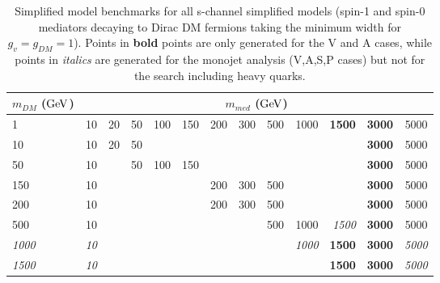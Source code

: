 \documentclass[a4,debug,notitlepage,nobib]{tufte-handout}
\begin{document}
\begin{sidewaystable}[!h]
\centering
\begin{tabular}{| l |r r r r r r r r r r r r|}
\hline
\multicolumn{1}{|c|}{$m_{DM}$ (${\rm GeV}$)} & \multicolumn{12}{c|}{$m_{med}$ (${\rm GeV}$)} \\
\hline
 1    & 10 & 20 & 50 & 100 & 150 & 200 & 300 & 500 & 1000 & \textbf{1500} & \textbf{3000} & 5000  \\
 10   & 10 & 20 & 50 &     &     &     &     &     &      &               & \textbf{3000} & 5000  \\
 50   & 10 &    & 50 & 100 & 150 &     &     &     &      &               & \textbf{3000} & 5000  \\
 150  & 10 &    &    &     &     & 200 & 300 & 500 &      &               & \textbf{3000} & 5000  \\
 200  & 10 &    &    &     &     & 200 & 300 & 500  &     &               & \textbf{3000} & 5000  \\
 500  & 10 &    &    &     &     &     &     & 500 & 1000 & \textit{1500} & \textbf{3000} & 5000  \\
 \textit{1000} & \textit{10} &    &    &     &     &     &     & & \textit{1000} & \textbf{1500} & \textbf{3000} & \textit{5000}  \\
 \textit{1500} & \textit{10} &    &    &     &     &     &     &              & & \textbf{1500} & \textbf{3000} & \textit{5000}  \\
\hline
\end{tabular}
\caption{Simplified model benchmarks for all s-channel simplified models (spin-1 and spin-0 mediators 
decaying to Dirac DM fermions taking the minimum width for $g_v = g_{DM} = 1$).
Points in \textbf{bold} points are only generated for the V and A cases, while points in 
\textit{italics} are generated for the monojet analysis (V,A,S,P cases) 
but not for the search including heavy quarks. }
\label{tab:ttdm_benchmarks}
\end{sidewaystable}
\end{document}
